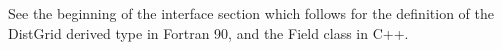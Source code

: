 

See the beginning of the interface section which
follows for the definition of the DistGrid derived type
in Fortran 90, and the Field class in C++.


